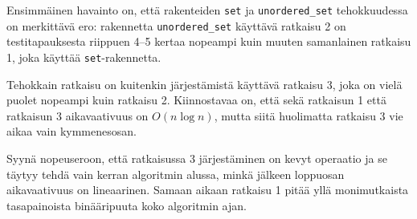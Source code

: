 Ensimmäinen havainto on, että rakenteiden
\texttt{set} ja \texttt{unordered\_set}
tehokkuudessa on merkittävä ero:
rakennetta \texttt{unordered\_set}
käyttävä ratkaisu 2 on testitapauksesta
riippuen 4–5 kertaa nopeampi
kuin muuten samanlainen ratkaisu 1,
joka käyttää \texttt{set}-rakennetta.

Tehokkain ratkaisu on kuitenkin järjestämistä
käyttävä ratkaisu 3, joka on vielä puolet
nopeampi kuin ratkaisu 2.
Kiinnostavaa on, että sekä ratkaisun 1 että
ratkaisun 3 aikavaativuus on $O(n \log n)$,
mutta siitä huolimatta
ratkaisu 3 vie aikaa vain kymmenesosan.

Syynä nopeuseroon, että
ratkaisussa 3 järjestäminen on kevyt
operaatio ja se täytyy tehdä vain kerran
algoritmin alussa, minkä jälkeen loppuosan
aikavaativuus on lineaarinen.
Samaan aikaan ratkaisu 1 pitää yllä monimutkaista
tasapainoista binääripuuta koko algoritmin ajan.

